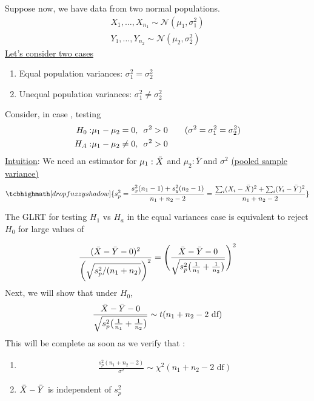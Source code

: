 Suppose now, we have data from two normal populations. 
\begin{gather*}
	X_1, \ldots, X_{n_1} \sim \mathcal{N}(\mu_1, \sigma^2_1)\\
	Y_1, \ldots, Y_{n_2} \sim \mathcal{N}(\mu_2, \sigma^2_2)
\end{gather*}
\underline{Let's consider two cases}
\begin{enumerate}[label=\protect\circled{\Roman*}]
	\item Equal population variances: $\sigma^2_1 = \sigma^2_2$
	\item Unequal population variances: $\sigma^2_1 \neq \sigma^2_2$
\end{enumerate}
Consider, in case , testing 
\begin{align*}
	H_0: & \mu_1 - \mu_2 = 0, \hspace{0.5em} \sigma^2 > 0 \qquad (\sigma^2 = \sigma^2_1 = \sigma^2_2)\\
	H_A: & \mu_1 - \mu_2 \neq 0, \hspace{0.5em} \sigma^2 > 0 
\end{align*}
\underline{Intuition}: We need an estimator for $\mu_1: \bar{X}$ and $\mu_2: \bar{Y}$ and $\sigma^2$ \underline{(pooled sample variance)}
\begin{gather*}
	\tcbhighmath[drop fuzzy shadow]{s^2_p = \frac{s^2_x (n_1 - 1) + s^2_y(n_2-1)}{n_1 + n_2 -2} = \frac{\sum_i (X_i - \bX)^2 + \sum_i (Y_i - \bar{Y})^2}{n_1 + n_2 -2}}
\end{gather*}
\begin{claim-N}
	The GLRT for testing $H_1$ vs $H_a$ in the equal variances case is equivalent to reject $H_0$ for large values of
\end{claim-N}
\begin{gather*}
	\frac{(\bar{X} - \bar{Y} - 0)^2}{\bigg( \sqrt{s^2_p / (n_1 + n_2)}\bigg)^2} = \Bigg(\frac{\bar{X} - \bar{Y} - 0}{\sqrt{s_p^2 \big(\frac{1}{n_1} + \frac{1}{n_2} \big)}} \Bigg)^2
\end{gather*}
Next, we will show that under $H_0$, 
\begin{gather*}
	\frac{\bar{X} - \bar{Y} - 0}{\sqrt{s_p^2 \big(\frac{1}{n_1} + \frac{1}{n_2} \big)}} \sim t(n_1 + n_2 - 2 \text{ df})
\end{gather*}
This will be complete as soon as we verify that :
\begin{enumerate}[label=\protect\circled{\Roman*}]
	\item 
	\begin{gather*}
		\frac{s_p^2 (n_1 + n_2 - 2)}{\sigma^2}\sim \chi^2(n_1 +n_2 - 2 \text{ df})
	\end{gather*}
	\item 		$\bar{X} - \bar{Y}$ is independent of $s_p^2$
\end{enumerate}
